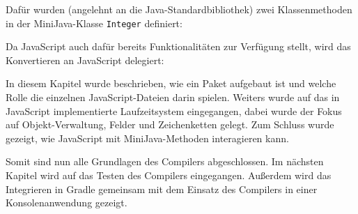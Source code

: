 Dafür wurden (angelehnt an die Java-Standardbibliothek) zwei Klassenmethoden in der MiniJava-Klasse \lstinline{Integer} definiert:


Da JavaScript auch dafür bereits Funktionalitäten zur Verfügung stellt, wird das Konvertieren an JavaScript delegiert:


\vspace{4em}
In diesem Kapitel wurde beschrieben, wie ein Paket aufgebaut ist und welche Rolle die einzelnen JavaScript-Dateien darin spielen. Weiters wurde auf das in JavaScript implementierte Laufzeitsystem eingegangen, dabei wurde der Fokus auf Objekt-Verwaltung, Felder und Zeichenketten gelegt. Zum Schluss wurde gezeigt, wie JavaScript mit MiniJava-Methoden interagieren kann.

Somit sind nun alle Grundlagen des Compilers abgeschlossen. Im nächsten Kapitel wird auf das Testen des Compilers eingegangen. Außerdem wird das Integrieren in Gradle gemeinsam mit dem Einsatz des Compilers in einer Konsolenanwendung gezeigt.

